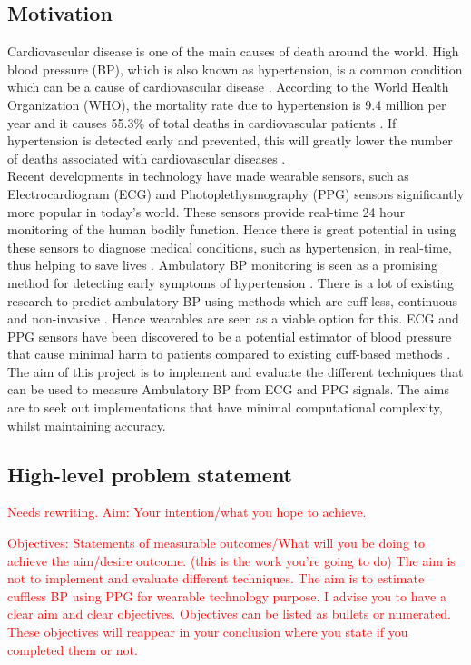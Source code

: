\subsection{Motivation}
Cardiovascular disease is one of the main causes of death around the world. 
High blood pressure (BP), which is also known as hypertension, is a common 
condition which can be a cause of cardiovascular disease \cite{Sharma2017}. 
According to the World Health Organization (WHO), the mortality rate due 
to hypertension is 9.4 million per year and it causes 55.3\%  of  total  
deaths  in  cardiovascular patients \cite{Janjua2017}. If hypertension is 
detected early and prevented, this will greatly lower the number of deaths 
associated with cardiovascular 
diseases \cite{Janjua2017}. \\ \newline \noindent Recent developments in 
technology have made wearable sensors, such as Electrocardiogram (ECG) and 
Photoplethysmography (PPG) sensors significantly more popular in today's 
world. These sensors provide real-time 24 hour monitoring of the human 
bodily function. Hence there is great potential in using these sensors to 
diagnose medical conditions, such as hypertension, in real-time, thus 
helping to save lives \cite{Simjanoska20182}. Ambulatory BP monitoring 
is seen as a promising method for detecting early symptoms of 
hypertension \cite{Kario2021}. There is a lot of existing research to 
predict ambulatory BP using methods which are cuff-less, continuous 
and non-invasive \cite{Zaki2018}. Hence wearables are seen as a 
viable option for this. ECG and PPG sensors have been discovered 
to be a potential estimator of blood pressure that cause minimal 
harm to patients compared to existing cuff-based 
methods \cite{Malikeh2019} \cite{Bard2019}.\\ \newline \noindent The aim 
of this project is to implement and evaluate the different 
techniques that can be used to measure Ambulatory BP from ECG and PPG 
signals. The aims are to seek out implementations that have minimal 
computational complexity, whilst maintaining accuracy.

\subsection{High-level problem statement}
\textcolor{red}{Needs rewriting. Aim: Your intention/what you hope to achieve.}

\textcolor{red}{Objectives: Statements of measurable outcomes/What will you be doing to achieve the aim/desire outcome. (this is the work you're going to do)}
\textcolor{red}{The aim is not to implement and evaluate different techniques. The aim is to estimate cuffless BP using PPG for wearable technology purpose.}
\textcolor{red}{I advise you to have a clear aim and clear objectives. Objectives can be listed as bullets or numerated. These objectives will reappear in your conclusion where you state if you completed them or not.}



